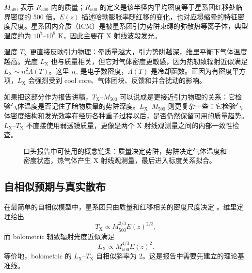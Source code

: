 \documentclass[UTF8,11pt,fontset=none]{ctexart}
\newcommand{\Mfive}{\ensuremath{M_{500}}}
\newcommand{\Rfive}{\ensuremath{R_{500}}}
\newcommand{\Lx}{\ensuremath{L_{\mathrm{X}}}}
\newcommand{\Tx}{\ensuremath{T_{\mathrm{X}}}}
\newcommand{\Ez}{\ensuremath{E(z)}}
\begin{document}
\Mfive{} 表示 \Rfive{} 内的质量；\Rfive{} 的定义是该半径内平均密度等于星系团红移处临界密度的 500 倍。\Ez{} 描述哈勃膨胀率随红移的变化，也对应塌缩晕的特征密度尺度。星系团内介质（ICM）是被星系团引力势阱束缚的弥散热等离子体，典型温度约为 $10^7$--$10^8$ K，因此主要在 X 射线波段发光。

温度 \Tx{} 更直接反映引力物理：晕质量越大，引力势阱越深，维里平衡下气体温度越高。光度 \Lx{} 也与质量相关，但它对气体密度更敏感，因为热轫致辐射近似满足 $L_{\mathrm{X}}\sim n_e^2\Lambda(T)$。这里 $n_e$ 是电子数密度，$\Lambda(T)$ 是冷却函数。正因为有密度平方项，\Lx{} 会强烈受到 cool core、气体团块、反馈和并合扰动的影响。

如果把这部分作为报告讲稿，\Tx--\Mfive{} 可以说成是更接近引力物理的关系：它检验气体温度是否记住了暗物质晕的势阱深度。\Lx--\Mfive{} 则更复杂一些：它检验气体密度结构和发光效率在经历各种重子过程以后，是否仍然保留可用的质量趋势。\Lx--\Tx{} 不直接使用弱透镜质量，更像是两个 X 射线观测量之间的内部一致性检查。

\begin{figure}[t]
  \centering
  \caption{口头报告中可使用的概念链条：质量决定势阱，势阱决定气体温度和密度状态，热气体产生 X 射线观测量，最后进入标度关系拟合。}
  \label{fig:physical-chain}
\end{figure}

\subsection{自相似预期与真实散布}

在最简单的自相似模型中，星系团只由质量和红移相关的密度尺度决定 \citep{kaiser1986,arnaud2005}。维里定理给出
\begin{equation}
  T_{\mathrm{X}} \propto M_{500}^{2/3} E(z)^{2/3},
\end{equation}
而 bolometric 轫致辐射光度近似满足
\begin{equation}
  L_{\mathrm{X}} \propto M_{500}^{4/3} E(z)^2.
\end{equation}
等价地，bolometric 的 $L_{\mathrm{X}}$--$T_{\mathrm{X}}$ 自相似斜率为 2。这是报告中需要先建立的理论基准线。
\end{document}
